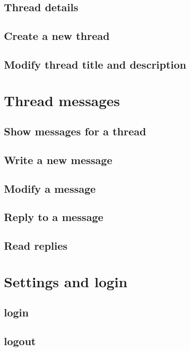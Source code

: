 \documentclass[12pt,a4paper,oneside]{report}
\begin{document}
\subsection{Thread details}

\subsection{Create a new thread}

\subsection{Modify thread title and description}

\section{Thread messages}

\subsection{Show messages for a thread}

\subsection{Write a new message}

\subsection{Modify a message}

\subsection{Reply to a message}

\subsection{Read replies}

\section{Settings and login}

\subsection{login}

\subsection{logout}
\end{document}
